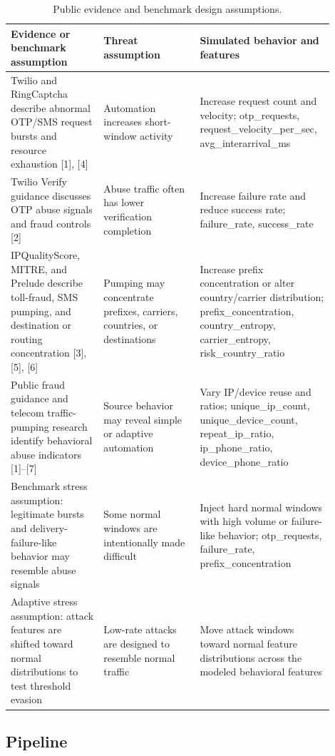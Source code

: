 \documentclass[conference]{IEEEtran}
\begin{document}
\begin{table}[!t]
\centering
\caption{Public evidence and benchmark design assumptions.}
\scriptsize
\begin{tabular}{>{\raggedright\arraybackslash}p{0.27\linewidth}>{\raggedright\arraybackslash}p{0.29\linewidth}>{\raggedright\arraybackslash}p{0.34\linewidth}}
\toprule
\textbf{Evidence or benchmark assumption} & \textbf{Threat assumption} & \textbf{Simulated behavior and features} \\
\midrule
Twilio and RingCaptcha describe abnormal OTP/SMS request bursts and resource exhaustion [1], [4] & Automation increases short-window activity & Increase request count and velocity; otp\_requests, request\_velocity\_per\_sec, avg\_interarrival\_ms \\
Twilio Verify guidance discusses OTP abuse signals and fraud controls [2] & Abuse traffic often has lower verification completion & Increase failure rate and reduce success rate; failure\_rate, success\_rate \\
IPQualityScore, MITRE, and Prelude describe toll-fraud, SMS pumping, and destination or routing concentration [3], [5], [6] & Pumping may concentrate prefixes, carriers, countries, or destinations & Increase prefix concentration or alter country/carrier distribution; prefix\_concentration, country\_entropy, carrier\_entropy, risk\_country\_ratio \\
Public fraud guidance and telecom traffic-pumping research identify behavioral abuse indicators [1]--[7] & Source behavior may reveal simple or adaptive automation & Vary IP/device reuse and ratios; unique\_ip\_count, unique\_device\_count, repeat\_ip\_ratio, ip\_phone\_ratio, device\_phone\_ratio \\
Benchmark stress assumption: legitimate bursts and delivery-failure-like behavior may resemble abuse signals & Some normal windows are intentionally made difficult & Inject hard normal windows with high volume or failure-like behavior; otp\_requests, failure\_rate, prefix\_concentration \\
Adaptive stress assumption: attack features are shifted toward normal distributions to test threshold evasion & Low-rate attacks are designed to resemble normal traffic & Move attack windows toward normal feature distributions across the modeled behavioral features \\
\bottomrule
\end{tabular}
\end{table}

\subsection{Pipeline}
\end{document}
